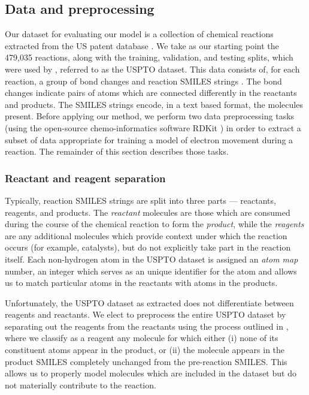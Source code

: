 
\subsection{Data and preprocessing}

Our dataset for evaluating our model is a collection of chemical reactions extracted from the US patent database
\citep{lowe2012extraction,Lowe2017}   . 
We take as our starting point the 479,035 reactions, along with the training, validation, and testing splits, 
which were used by \citet{jin2017predicting}, referred to as the USPTO dataset.
This data consists of, for each reaction, a group of bond changes and reaction SMILES strings \citep{weininger1988smiles}.
The bond changes indicate pairs of atoms which are connected differently in the reactants and products.
The SMILES strings encode, in a text based format, the molecules present.
Before applying our method, we perform two data preprocessing tasks (using the open-source chemo-informatics software RDKit
  \citep{rdkit}) in order to extract a subset of data appropriate for training a
 model of electron movement during a reaction. The remainder of this section describes those tasks.

\subsubsection{Reactant and reagent separation}

Typically, reaction SMILES strings are split into three parts --- reactants, reagents, and products.
The {\em reactant} molecules are those which are consumed during the course of the chemical reaction to form the {\em product}, 
while the {\em reagents} are any additional molecules which provide context under which the reaction occurs (for example, catalysts),
but do not explicitly take part in the reaction  itself.
Each non-hydrogen atom in the USPTO dataset is assigned an {\em atom map} number, an integer which serves as an unique identifier for the atom and allows us to match particular atoms in the reactants with atoms in the products.

Unfortunately, the USPTO dataset as extracted does not differentiate between reagents and reactants.
We elect to preprocess the entire USPTO dataset by separating out the reagents from the reactants using the process outlined in \citet{schwaller2017found}, where we classify as a reagent any molecule for which either 
(i) none of its constituent atoms appear in the product, or 
(ii) the molecule appears in the product SMILES completely unchanged from the pre-reaction SMILES.
This allows us to properly model molecules which are included in the dataset but do not materially contribute to the reaction.


